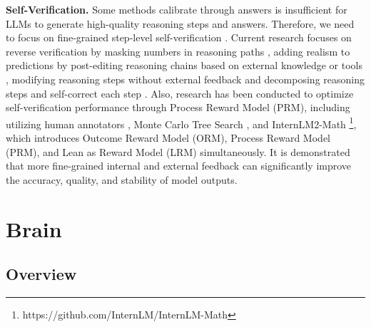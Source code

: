 \documentclass[11pt]{article}
\begin{document}
\textbf{Self-Verification.} Some methods \citep{yu2023outcomesupervised, dengUnifiedViewAnswer2023} calibrate through answers is insufficient for LLMs to generate high-quality reasoning steps and answers. Therefore, we need to focus on fine-grained step-level self-verification \citep{wuFineGrainedHumanFeedback2023}. Current research focuses on reverse verification by masking numbers in reasoning paths \citep{wuGetMathProgressive2023, liMakingLargeLanguage}, adding realism to predictions by post-editing reasoning chains based on external knowledge or tools \citep{zhaoVerifyandEditKnowledgeEnhancedChainofThought2023,sunAdaPlannerAdaptivePlanning2023}, modifying reasoning steps without external feedback \citep{hongCloserLookSelfVerification2023,huangLargeLanguageModels2023} and decomposing reasoning steps and self-correct each step \citep{paulREFINERReasoningFeedback2023, lingDeductiveVerificationChainofThought2023}. Also, research has been conducted to optimize self-verification performance through Process Reward Model (PRM), including utilizing human annotators \citep{zhuSolvingMathWord2023,lightmanLetVerifyStep2023}, Monte Carlo Tree Search \citep{wangMathShepherdLabelFreeStepbyStep2023,haoReasoningLanguageModel2023}, and InternLM2-Math \footnote{https://github.com/InternLM/InternLM-Math}, which introduces Outcome Reward Model (ORM), Process Reward Model (PRM), and Lean as Reward Model (LRM) simultaneously. It is demonstrated that more fine-grained internal and external feedback can significantly improve the accuracy, quality, and stability of model outputs.


\section{Brain}

\subsection{Overview}
\end{document}
